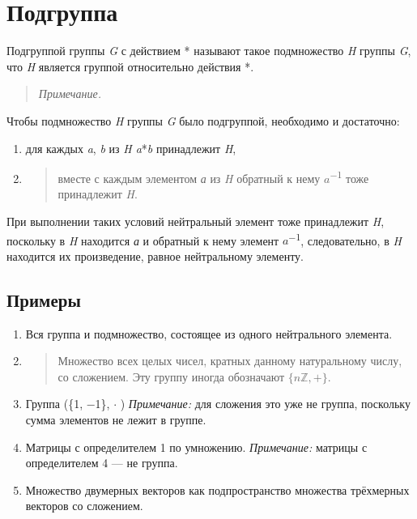 \documentclass[12pt]{article}
\begin{document}
    \section{Подгруппа}

    Подгруппой группы \emph{G} с действием * называют такое подмножество
    \emph{H} группы \emph{G}, что \emph{H} является группой относительно
    действия *.

    \begin{quote}
        \emph{Примечание.}
    \end{quote}

    Чтобы подмножество \emph{H} группы \emph{G} было подгруппой, необходимо
    и достаточно:

    \begin{enumerate}
        \def\labelenumi{\arabic{enumi}.}
        \item
              для каждых \emph{a}, \emph{b} из \emph{H a}*\emph{b} принадлежит
              \emph{H},
        \item
              \begin{quote}
                  вместе с каждым элементом \emph{а} из \emph{H} обратный к нему
                  $a$\textsuperscript{−1} тоже принадлежит \emph{H}.
              \end{quote}
    \end{enumerate}

    При выполнении таких условий нейтральный элемент тоже принадлежит
    \emph{H}, поскольку в \emph{H} находится \emph{а} и обратный к нему
    элемент $a$\textsuperscript{−1}, следовательно, в \emph{H} находится их
    произведение, равное нейтральному элементу.

    \subsection{Примеры}

    \begin{enumerate}
        \item
              Вся группа и подмножество, состоящее из одного нейтрального элемента.
        \item
              \begin{quote}
                  Множество всех целых чисел, кратных данному натуральному числу, со
                  сложением. Эту группу иногда обозначают $\{n\mathbb{Z}, +\}$.
              \end{quote}
        \item
              Группа (\{1, −1\}, $\cdot$ ) \emph{Примечание:} для сложения это уже не группа, поскольку сумма элементов не лежит в группе.
        \item
              Матрицы с определителем 1 по умножению. \emph{Примечание:} матрицы с
              определителем 4 --- не группа.
        \item
              Множество двумерных векторов как подпространство множества трёхмерных
              векторов со сложением.
    \end{enumerate}
\end{document}
